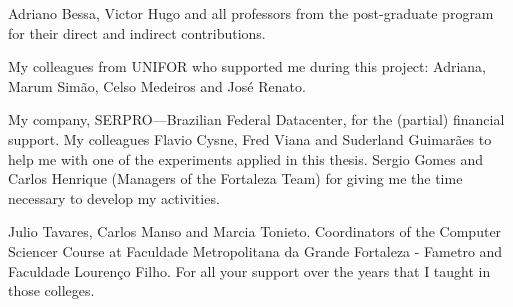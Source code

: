 Adriano Bessa, Victor Hugo and all professors from the post-graduate program for their direct and indirect contributions.

My colleagues from UNIFOR who supported me during this project: Adriana, Marum Simão, Celso Medeiros and José Renato. 

My company, SERPRO—Brazilian Federal Datacenter, for the (partial) financial support. My colleagues Flavio Cysne, Fred Viana and Suderland Guimarães to help me with one of the experiments applied in this thesis. Sergio Gomes and Carlos Henrique (Managers of the Fortaleza Team) for giving me the time necessary to develop my activities.

Julio Tavares, Carlos Manso and Marcia Tonieto. Coordinators of the Computer Sciencer Course at
Faculdade Metropolitana da Grande Fortaleza - Fametro and Faculdade Lourenço Filho. For all your support over the years that I taught in those colleges.

